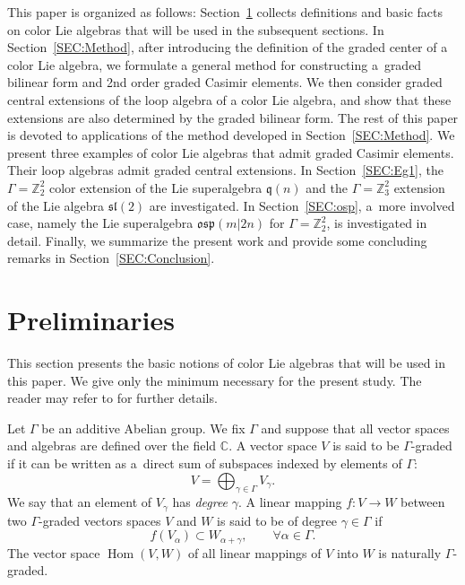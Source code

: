 \documentclass[pdftex]{sigma}
\numberwithin{equation}{section}
\theoremstyle{definition}
\def\Z2{\mathbb{Z}_2^2}
\def\osp{\mathfrak{osp}}
\def\sl{\mathfrak{sl}}
\def\q{\mathfrak{q}}
\begin{document}
This paper is organized as follows: Section~\ref{SEC:Pre} collects definitions and basic facts on color Lie algebras that will be used in the subsequent sections.
In Section~\ref{SEC:Method}, after introducing the definition of the graded center of a color Lie algebra, we formulate a general method for constructing a~graded bilinear form and 2nd order graded Casimir elements. We then consider graded central extensions of the loop algebra of a color Lie algebra, and show that these extensions are also determined by the graded bilinear form.
The rest of this paper is devoted to applications of the method developed in Section~\ref{SEC:Method}.
We present three examples of color Lie algebras that admit graded Casimir elements.
Their loop algebras admit graded central extensions.
In Section~\ref{SEC:Eg1}, the $\Gamma = \Z2$ color extension of the Lie superalgebra $\q(n)$ and the $\Gamma = \mathbb{Z}^2_3$ extension of the Lie algebra $\sl(2)$ are investigated.
In Section~\ref{SEC:osp}, a~more involved case, namely the Lie superalgebra $\osp(m|2n)$ for $\Gamma = \Z2$, is investigated in detail.
Finally, we summarize the present work and provide some concluding remarks in Section~\ref{SEC:Conclusion}.

\section{Preliminaries} \label{SEC:Pre}

This section presents the basic notions of color Lie algebras that will be used in this paper.
We give only the minimum necessary for the present study.
The reader may refer to \cite{scheu,scheuTen,zhang2025} for further details.

Let $\Gamma$ be an additive Abelian group. We fix $\Gamma$ and suppose that all vector spaces and algebras are defined over the field $\mathbb{C}$.
A vector space $V$ is said to be $\Gamma$-graded if it can be written as a~direct sum of subspaces indexed by elements of $\Gamma$:
\begin{equation*}
	V = \bigoplus_{\gamma \in \Gamma} V_{\gamma}.
\end{equation*}
We say that an element of $ V_{\gamma}$ has \textit{degree} $\gamma$.
A linear mapping $ f\colon V \to W $ between two $\Gamma$-graded vectors spaces $V$ and $ W $ is said to be of degree $\gamma \in \Gamma $ if
\begin{equation*}
	f(V_{\alpha}) \subset W_{\alpha+\gamma}, \qquad \forall \alpha \in \Gamma.
\end{equation*}
The vector space $ \operatorname{Hom}	(V,W)$ of all linear mappings of $ V $ into $ W $ is naturally $\Gamma$-graded.
\end{document}
